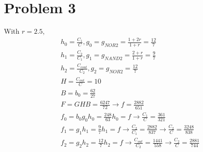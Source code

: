 \documentclass[a4paper,10pt]{article}
\begin{document}
\section*{Problem 3}
With \begin{math}r=2.5\end{math}, 
\begin{equation}
\begin{split}
&h_0=\frac{C_1}{C}, g_0=g_{NOR2}=\frac{1+2r}{1+r}=\frac{12}{7}\\
&h_1=\frac{C_2}{C_1}, g_1=g_{NAND2}=\frac{2+r}{1+r}=\frac{9}{7}\\
&h_2=\frac{C_{cout}}{C_2}, g_2=g_{NOR2}=\frac{12}{7}\\
&H=\frac{C_{out}}{C}=10\\
&B=b_0=\frac{62}{27}\\
&F=GHB=\frac{6247}{72}\rightarrow f=\frac{2882}{651}\\
&f_0=b_0 g_0 h_0 = \frac{248}{63}h_0 =f\rightarrow \frac{C_1}{C}=\frac{361}{321}\\
&f_1=g_1 h_1 =\frac{9}{7}h_1 =f\rightarrow \frac{C_2}{C_1}=\frac{2882}{837}\rightarrow\frac{C_2}{C}=\frac{3248}{838}\\
&f_2=g_2 h_2 =\frac{12}{7}h_2=f\rightarrow\frac{C_{out}}{C_2}=\frac{1441}{558}\rightarrow\frac{C_2}{C}=\frac{2881}{744}\\
\end{split}
\end{equation}
\end{document}
